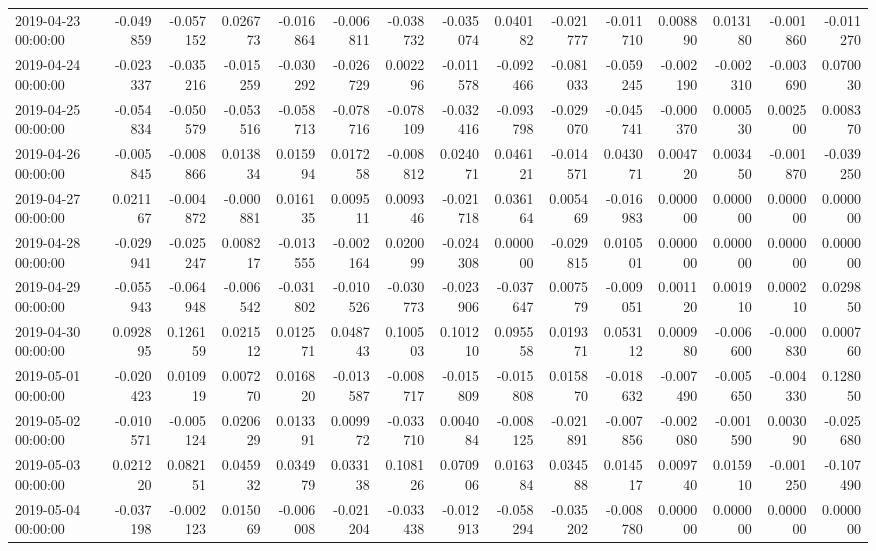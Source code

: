 \begin{tabular}{lrrrrrrrrrrrrrr}
2019-04-23 00:00:00 & -0.049859 & -0.057152 & 0.026773 & -0.016864 & -0.006811 & -0.038732 & -0.035074 & 0.040182 & -0.021777 & -0.011710 & 0.008890 & 0.013180 & -0.001860 & -0.011270 \\
2019-04-24 00:00:00 & -0.023337 & -0.035216 & -0.015259 & -0.030292 & -0.026729 & 0.002296 & -0.011578 & -0.092466 & -0.081033 & -0.059245 & -0.002190 & -0.002310 & -0.003690 & 0.070030 \\
2019-04-25 00:00:00 & -0.054834 & -0.050579 & -0.053516 & -0.058713 & -0.078716 & -0.078109 & -0.032416 & -0.093798 & -0.029070 & -0.045741 & -0.000370 & 0.000530 & 0.002500 & 0.008370 \\
2019-04-26 00:00:00 & -0.005845 & -0.008866 & 0.013834 & 0.015994 & 0.017258 & -0.008812 & 0.024071 & 0.046121 & -0.014571 & 0.043071 & 0.004720 & 0.003450 & -0.001870 & -0.039250 \\
2019-04-27 00:00:00 & 0.021167 & -0.004872 & -0.000881 & 0.016135 & 0.009511 & 0.009346 & -0.021718 & 0.036164 & 0.005469 & -0.016983 & 0.000000 & 0.000000 & 0.000000 & 0.000000 \\
2019-04-28 00:00:00 & -0.029941 & -0.025247 & 0.008217 & -0.013555 & -0.002164 & 0.020099 & -0.024308 & 0.000000 & -0.029815 & 0.010501 & 0.000000 & 0.000000 & 0.000000 & 0.000000 \\
2019-04-29 00:00:00 & -0.055943 & -0.064948 & -0.006542 & -0.031802 & -0.010526 & -0.030773 & -0.023906 & -0.037647 & 0.007579 & -0.009051 & 0.001120 & 0.001910 & 0.000210 & 0.029850 \\
2019-04-30 00:00:00 & 0.092895 & 0.126159 & 0.021512 & 0.012571 & 0.048743 & 0.100503 & 0.101210 & 0.095558 & 0.019371 & 0.053112 & 0.000980 & -0.006600 & -0.000830 & 0.000760 \\
2019-05-01 00:00:00 & -0.020423 & 0.010919 & 0.007270 & 0.016820 & -0.013587 & -0.008717 & -0.015809 & -0.015808 & 0.015870 & -0.018632 & -0.007490 & -0.005650 & -0.004330 & 0.128050 \\
2019-05-02 00:00:00 & -0.010571 & -0.005124 & 0.020629 & 0.013391 & 0.009972 & -0.033710 & 0.004084 & -0.008125 & -0.021891 & -0.007856 & -0.002080 & -0.001590 & 0.003090 & -0.025680 \\
2019-05-03 00:00:00 & 0.021220 & 0.082151 & 0.045932 & 0.034979 & 0.033138 & 0.108126 & 0.070906 & 0.016384 & 0.034588 & 0.014517 & 0.009740 & 0.015910 & -0.001250 & -0.107490 \\
2019-05-04 00:00:00 & -0.037198 & -0.002123 & 0.015069 & -0.006008 & -0.021204 & -0.033438 & -0.012913 & -0.058294 & -0.035202 & -0.008780 & 0.000000 & 0.000000 & 0.000000 & 0.000000 \\

\end{tabular}
